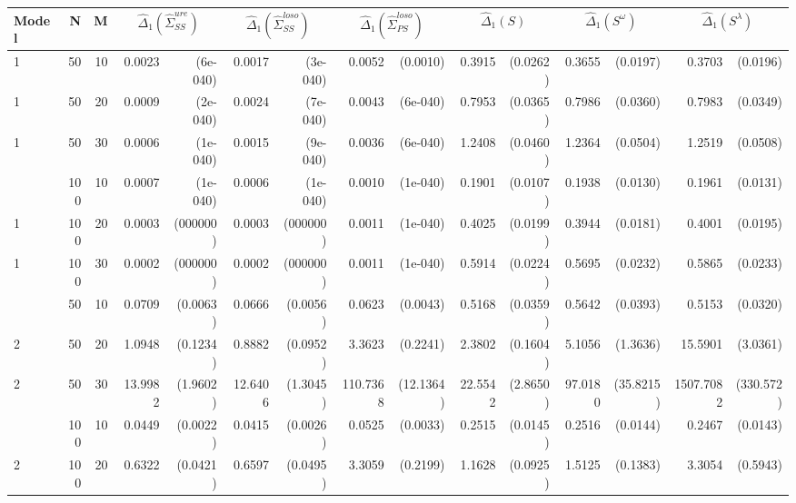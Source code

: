 \begin{table}[ht]
\centering
\begin{small}
\begin{tabular}{lrr|rr|rr|rr|rr|rr|rr}
Model & N & M & \multicolumn{2}{c}{$\hat{\Delta}_1(\hat{\Sigma}^{ure}_{SS})$} &  \multicolumn{2}{c}{$\hat{\Delta}_1(\hat{\Sigma}^{loso}_{SS})$}&  \multicolumn{2}{c}{$\hat{\Delta}_1(\hat{\Sigma}^{loso}_{PS})$} & \multicolumn{2}{c}{$\hat{\Delta}_1(S)$} &  \multicolumn{2}{c}{$\hat{\Delta}_1(S^\omega)$}  &  \multicolumn{2}{c}{$\hat{\Delta}_1(S^\lambda)$}   \\ 
  \hline
1 & 50 & 10 & 0.0023 & (6e-040) & 0.0017 & (3e-040) & 0.0052 & (0.0010) & 0.3915 & (0.0262) & 0.3655 & (0.0197) & 0.3703 & (0.0196) \\ 
  1 & 50 & 20 & 0.0009 & (2e-040) & 0.0024 & (7e-040) & 0.0043 & (6e-040) & 0.7953 & (0.0365) & 0.7986 & (0.0360) & 0.7983 & (0.0349) \\ 
  1 & 50 & 30 & 0.0006 & (1e-040) & 0.0015 & (9e-040) & 0.0036 & (6e-040) & 1.2408 & (0.0460) & 1.2364 & (0.0504) & 1.2519 & (0.0508) \\ 
\hdashline
  1 & 100 & 10 & 0.0007 & (1e-040) & 0.0006 & (1e-040) & 0.0010 & (1e-040) & 0.1901 & (0.0107) & 0.1938 & (0.0130) & 0.1961 & (0.0131) \\ 
  1 & 100 & 20 & 0.0003 & (000000) & 0.0003 & (000000) & 0.0011 & (1e-040) & 0.4025 & (0.0199) & 0.3944 & (0.0181) & 0.4001 & (0.0195) \\ 
  1 & 100 & 30 & 0.0002 & (000000) & 0.0002 & (000000) & 0.0011 & (1e-040) & 0.5914 & (0.0224) & 0.5695 & (0.0232) & 0.5865 & (0.0233) \\ 
\hdashline
\hdashline
  2 & 50 & 10 & 0.0709 & (0.0063) & 0.0666 & (0.0056) & 0.0623 & (0.0043) & 0.5168 & (0.0359) & 0.5642 & (0.0393) & 0.5153 & (0.0320) \\ 
  2 & 50 & 20 & 1.0948 & (0.1234) & 0.8882 & (0.0952) & 3.3623 & (0.2241) & 2.3802 & (0.1604) & 5.1056 & (1.3636) & 15.5901 & (3.0361) \\ 
  2 & 50 & 30 & 13.9982 & (1.9602) & 12.6406 & (1.3045) & 110.7368 & (12.1364) & 22.5542 & (2.8650) & 97.0180 & (35.8215) & 1507.7082 & (330.572) \\ 
\hdashline
  2 & 100 & 10 & 0.0449 & (0.0022) & 0.0415 & (0.0026) & 0.0525 & (0.0033) & 0.2515 & (0.0145) & 0.2516 & (0.0144) & 0.2467 & (0.0143) \\ 
  2 & 100 & 20 & 0.6322 & (0.0421) & 0.6597 & (0.0495) & 3.3059 & (0.2199) & 1.1628 & (0.0925) & 1.5125 & (0.1383) & 3.3054 & (0.5943) \\ 

\end{tabular}
\end{small}
\end{table}
